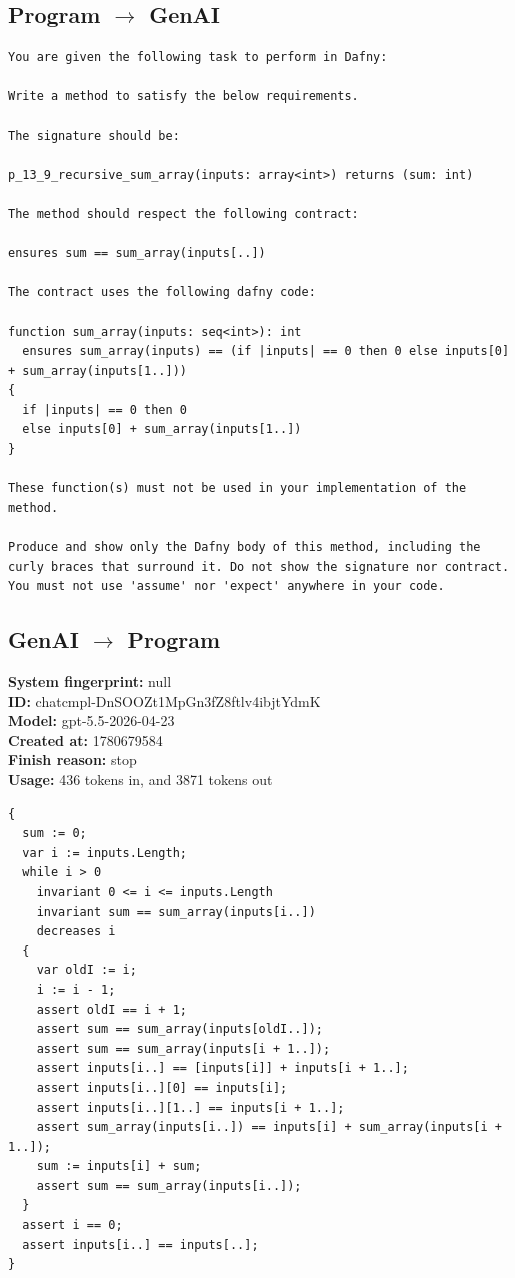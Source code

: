 \documentclass{article}
\begin{document}
\subsection*{Program $\rightarrow$ GenAI}
\begin{lstlisting}
You are given the following task to perform in Dafny:

Write a method to satisfy the below requirements.

The signature should be:

p_13_9_recursive_sum_array(inputs: array<int>) returns (sum: int)

The method should respect the following contract:

ensures sum == sum_array(inputs[..])

The contract uses the following dafny code:

function sum_array(inputs: seq<int>): int
  ensures sum_array(inputs) == (if |inputs| == 0 then 0 else inputs[0] + sum_array(inputs[1..]))
{
  if |inputs| == 0 then 0
  else inputs[0] + sum_array(inputs[1..])
}

These function(s) must not be used in your implementation of the method.

Produce and show only the Dafny body of this method, including the curly braces that surround it. Do not show the signature nor contract. You must not use 'assume' nor 'expect' anywhere in your code.
\end{lstlisting}
\subsection*{GenAI $\rightarrow$ Program}
\textbf{System fingerprint: }null
\\\textbf{ID: }chatcmpl-DnSOOZt1MpGn3fZ8ftlv4ibjtYdmK
\\\textbf{Model: }gpt-5.5-2026-04-23
\\\textbf{Created at: }1780679584
\\\textbf{Finish reason: }stop
\\\textbf{Usage: }436 tokens in, and 3871 tokens out
\begin{lstlisting}
{
  sum := 0;
  var i := inputs.Length;
  while i > 0
    invariant 0 <= i <= inputs.Length
    invariant sum == sum_array(inputs[i..])
    decreases i
  {
    var oldI := i;
    i := i - 1;
    assert oldI == i + 1;
    assert sum == sum_array(inputs[oldI..]);
    assert sum == sum_array(inputs[i + 1..]);
    assert inputs[i..] == [inputs[i]] + inputs[i + 1..];
    assert inputs[i..][0] == inputs[i];
    assert inputs[i..][1..] == inputs[i + 1..];
    assert sum_array(inputs[i..]) == inputs[i] + sum_array(inputs[i + 1..]);
    sum := inputs[i] + sum;
    assert sum == sum_array(inputs[i..]);
  }
  assert i == 0;
  assert inputs[i..] == inputs[..];
}
\end{lstlisting}
\end{document}
